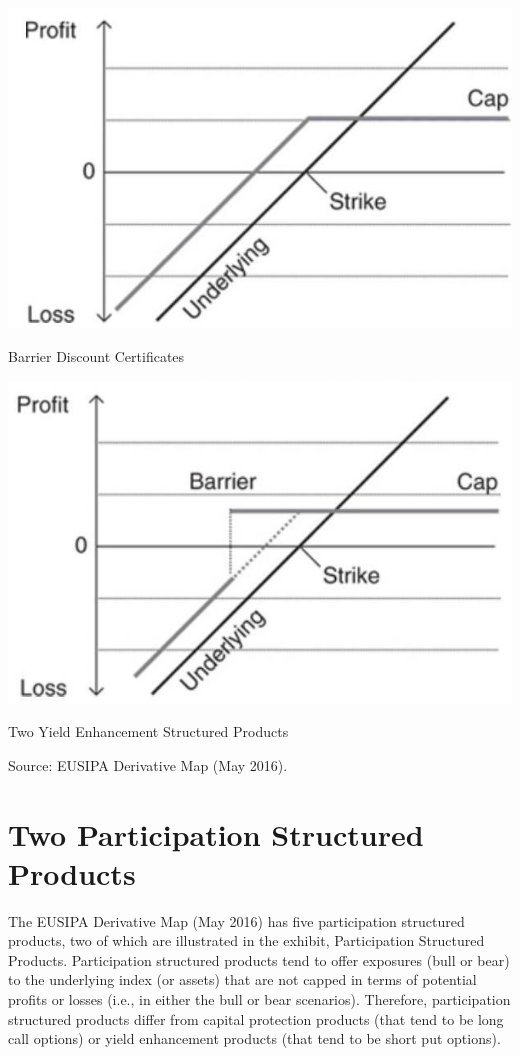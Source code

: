 \documentclass[11pt]{article}
\begin{document}
\begin{center}
\includegraphics[max width=\textwidth]{2024_04_10_b75ef470ae043c0f718dg-3(1)}
\end{center}

Barrier Discount Certificates

\begin{center}
\includegraphics[max width=\textwidth]{2024_04_10_b75ef470ae043c0f718dg-3(2)}
\end{center}

Two Yield Enhancement Structured Products

Source: EUSIPA Derivative Map (May 2016).

\section*{Two Participation Structured Products}
The EUSIPA Derivative Map (May 2016) has five participation structured products, two of which are illustrated in the exhibit, Participation Structured Products. Participation structured products tend to offer exposures (bull or bear) to the underlying index (or assets) that are not capped in terms of potential profits or losses (i.e., in either the bull or bear scenarios). Therefore, participation structured products differ from capital protection products (that tend to be long call options) or yield enhancement products (that tend to be short put options).
\end{document}
